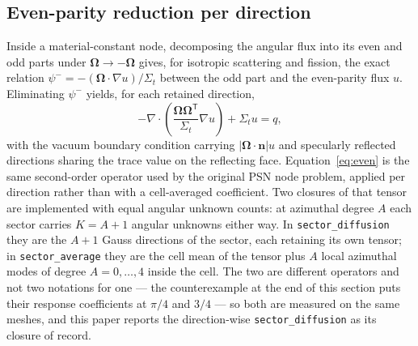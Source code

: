 \documentclass[11pt,a4paper]{article}
\begin{document}
\subsection{Even-parity reduction per direction}
Inside a material-constant node, decomposing the angular flux into its even and
odd parts under $\boldsymbol{\Omega}\rightarrow-\boldsymbol{\Omega}$ gives, for
isotropic scattering and fission, the exact relation
$\psi^{-}=-(\boldsymbol{\Omega}\cdot\nabla u)/\Sigma_t$ between the odd part and
the even-parity flux $u$. Eliminating $\psi^{-}$ yields, for each retained
direction,
\begin{equation}
-\nabla\cdot\!\left(\frac{\boldsymbol{\Omega}\boldsymbol{\Omega}^{\mathsf T}}{\Sigma_t}
\nabla u\right) +\Sigma_t u = q ,
\label{eq:even}
\end{equation}
with the vacuum boundary condition carrying $|\boldsymbol{\Omega}\cdot\mathbf{n}|u$
and specularly reflected directions sharing the trace value on the reflecting face.
Equation~\eqref{eq:even} is the same second-order operator used by the original PSN
node problem, applied per direction rather than with a cell-averaged coefficient.
Two closures of that tensor are implemented with equal angular unknown counts: at azimuthal degree $A$
each sector carries $K{=}A{+}1$ angular unknowns either way. In
\texttt{sector\_diffusion} they are the $A{+}1$ Gauss directions of the sector, each
retaining its own tensor; in \texttt{sector\_average} they are the cell mean of the
tensor plus $A$ local azimuthal modes of degree $A{=}0,\ldots,4$ inside the cell. The
two are different operators and not two notations for one --- the counterexample at the
end of this section puts their response coefficients at $\pi/4$ and $3/4$ --- so both
are measured on the same meshes, and this paper reports the direction-wise
\texttt{sector\_diffusion} as its closure of record.
\end{document}
